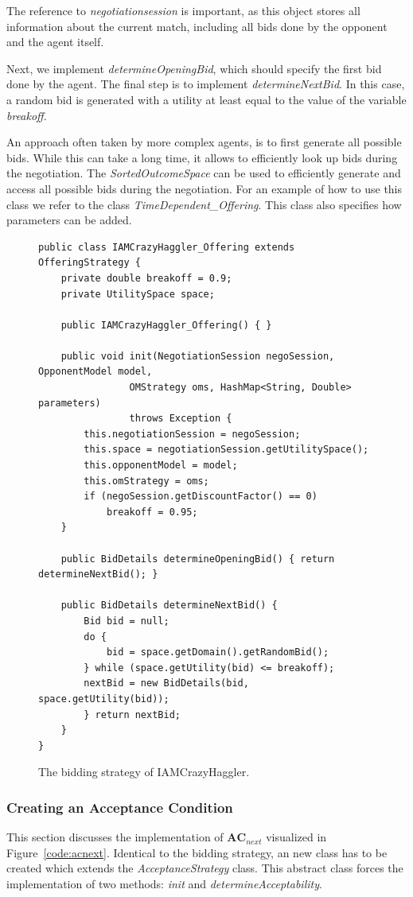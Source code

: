 \documentclass[]{article}
\begin{document}
The reference to \textit{negotiationsession} is important, as this object stores all information about the current match, including all bids done by the opponent and the agent itself.

Next, we implement \textit{determineOpeningBid}, which should specify the first bid done by the agent. The final step is to implement \textit{determineNextBid}. In this case, a random bid is generated with a utility at least equal to the value of the variable \textit{breakoff}.

An approach often taken by more complex agents, is to first generate all possible bids. While this can take a long time, it allows to efficiently look up bids during the negotiation. The \textit{SortedOutcomeSpace} can be used to efficiently generate and access all possible bids during the negotiation. For an example of how to use this class we refer to the class \textit{TimeDependent\_Offering}. This class also specifies how parameters can be added.

\begin{figure}[htb]
\begin{lstlisting}[basicstyle=\small]
public class IAMCrazyHaggler_Offering extends OfferingStrategy {
	private double breakoff = 0.9;
	private UtilitySpace space;

	public IAMCrazyHaggler_Offering() { }

	public void init(NegotiationSession negoSession, OpponentModel model,
				OMStrategy oms, HashMap<String, Double> parameters)
				throws Exception {
		this.negotiationSession = negoSession;
		this.space = negotiationSession.getUtilitySpace();
		this.opponentModel = model;
		this.omStrategy = oms;
		if (negoSession.getDiscountFactor() == 0)
			breakoff = 0.95;
	}

	public BidDetails determineOpeningBid() { return determineNextBid(); }

	public BidDetails determineNextBid() {
		Bid bid = null;
		do {
 			bid = space.getDomain().getRandomBid();
		} while (space.getUtility(bid) <= breakoff);
		nextBid = new BidDetails(bid, space.getUtility(bid));
		} return nextBid;
	}
}
\end{lstlisting}
\caption{The bidding strategy of IAMCrazyHaggler.}\label{code:biddingstrategy}
\end{figure}

\subsubsection{Creating an Acceptance Condition}
This section discusses the implementation of $\textbf{AC}_{next}$ visualized in Figure~\ref{code:acnext}. Identical to the bidding strategy, an new class has to be created which extends the \textit{AcceptanceStrategy} class. This abstract class forces the implementation of two methods: \textit{init} and \textit{determineAcceptability}.
\end{document}
